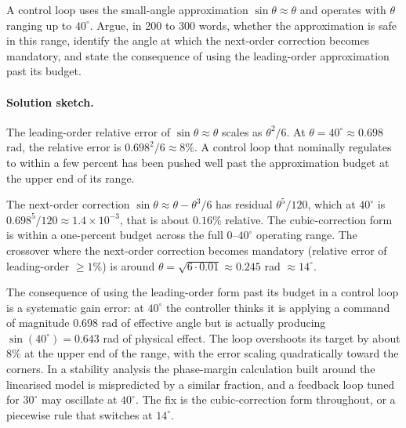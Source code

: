 \begin{exercise}
A control loop uses the small-angle approximation $\sin \theta
\approx \theta$ and operates with $\theta$ ranging up to $40^{\circ}$.
Argue, in 200 to 300 words, whether the approximation is safe in this
range, identify the angle at which the next-order correction becomes
mandatory, and state the consequence of using the leading-order
approximation past its budget.

\paragraph{Solution sketch.} The leading-order relative error of
$\sin\theta \approx \theta$ scales as $\theta^{2}/6$. At
$\theta = 40^{\circ} \approx 0.698$ rad, the relative error is
$0.698^{2}/6 \approx 8\%$. A control loop that nominally regulates
to within a few percent has been pushed well past the approximation
budget at the upper end of its range.

The next-order correction $\sin\theta \approx \theta - \theta^{3}/6$
has residual $\theta^{5}/120$, which at $40^{\circ}$ is $0.698^{5}/120
\approx 1.4 \times 10^{-3}$, that is about $0.16\%$ relative. The
cubic-correction form is within a one-percent budget across the full
$0$--$40^{\circ}$ operating range. The crossover where the next-order
correction becomes mandatory (relative error of leading-order $\geq
1\%$) is around $\theta = \sqrt{6 \cdot 0.01} \approx 0.245$ rad
$\approx 14^{\circ}$.

The consequence of using the leading-order form past its budget in a
control loop is a systematic gain error: at $40^{\circ}$ the
controller thinks it is applying a command of magnitude $0.698$ rad
of effective angle but is actually producing $\sin(40^{\circ}) =
0.643$ rad of physical effect. The loop overshoots its target by
about $8\%$ at the upper end of the range, with the error scaling
quadratically toward the corners. In a stability analysis the
phase-margin calculation built around the linearised model is
mispredicted by a similar fraction, and a feedback loop tuned for
$30^{\circ}$ may oscillate at $40^{\circ}$. The fix is the
cubic-correction form throughout, or a piecewise rule that switches
at $14^{\circ}$.
\end{exercise}

